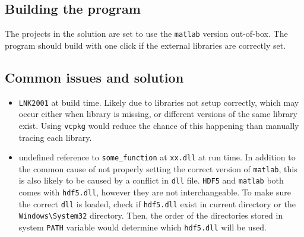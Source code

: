 \documentclass[10pt]{article} %
\begin{document}
\subsection{Building the program}

The projects in the solution are set to use the \texttt{matlab} version out-of-box. The program should build with one click if the external libraries are correctly set.

\subsection{Common issues and solution}
\begin{itemize}
\item
\texttt{LNK2001} at build time. Likely due to libraries not setup correctly, which may occur either when library is missing, or different versions of the same library exist. Using \texttt{vcpkg} would reduce the chance of this happening than manually tracing each library.
\item
undefined reference to \texttt{some\_function} at \texttt{xx.dll} at run time. In addition to the common cause of not properly setting the correct version of \texttt{matlab}, this is also likely to be caused by a conflict in \texttt{dll} file. \texttt{HDF5} and \texttt{matlab} both comes with \texttt{hdf5.dll}, however they are not interchangeable. To make sure the correct \texttt{dll} is loaded, check if \texttt{hdf5.dll} exist in current directory or the \texttt{Windows\textbackslash System32} directory. Then, the order of the directories stored in system \texttt{PATH} variable would determine which \texttt{hdf5.dll} will be used.
\end{itemize}
\end{document}
